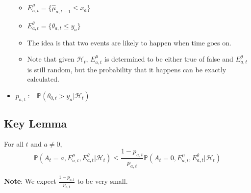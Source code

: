 \documentclass[11pt]{article}
\begin{document}
\begin{itemize}
    \begin{itemize}
        \item $E^\mu_{a, t} = \{\hat{\mu}_{a, t-1} \leq x_a\}$
        \item $E^\theta_{a, t} = \{\theta_{a, t} \leq y_a\}$
        \item The idea is that two events are likely to happen when time goes on. 
        \item Note that given $\mathcal{H}_t$, $E^\mu_{a, t}$ is determined to be either true of false and $E^\theta_{a, t}$ is still random, but the probability that it happens can be exactly calculated. 
    \end{itemize}
    \item $p_{a, t} := \mathbb{P}(\theta_{0, t} > y_a | \mathcal{H}_t)$
\end{itemize}

\subsection{Key Lemma}
\begin{lemma}
For all $t$ and $a \neq 0$, 
$$
    \mathbb{P}(A_t = a, E^\mu_{a, t}, E^\theta_{a, t} | \mathcal{H}_t) \leq \frac{1 - p_{a, t}}{p_{a, t}} \mathbb{P}(A_t = 0, E^\mu_{a, t}, E^\theta_{a, t} | \mathcal{H}_t)
$$
\end{lemma}

\noindent \textbf{Note}: We expect $\frac{1 - p_{a, t}}{p_{a, t}}$ to be very small. 
\end{document}
